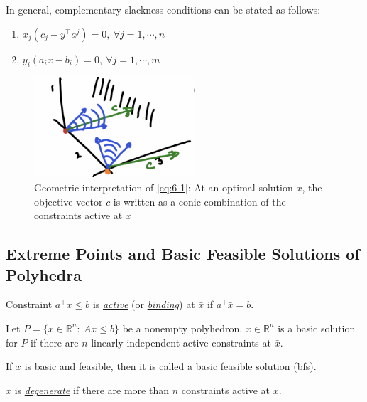 \documentclass[11pt]{article}
\numberwithin{equation}{section}
\begin{document}
In general, complementary slackness conditions can be stated as follows:
\begin{enumerate}[1.]
    \item $x_j(c_j - y^\top a^j)=0, \ \forall j=1, \cdots, n$
    \item $y_i(a_i x - b_i)=0, \ \forall j=1, \cdots, m$
\end{enumerate}

\begin{figure}[H]
    \centering
    \includegraphics[width=6cm]{images/6-ex-2.png}
    \caption{Geometric interpretation of \ref{eq:6-1}: At an optimal solution $x$, the objective vector $c$ is written as a conic combination of the constraints active at $x$}
\end{figure}

\subsection{Extreme Points and Basic Feasible Solutions of Polyhedra}
\begin{definition}
    Constraint $a^\top x \leq b$ is \underline{\textit{active}} (or \underline{\textit{binding}}) at $\bar{x}$ if $a^\top \bar{x}=b$.
\end{definition}

\begin{definition}
    Let $P=\{x \in \mathbb{R}^n: \ Ax \leq b\}$ be a nonempty polyhedron. $x \in \mathbb{R}^n$ is a basic solution for $P$ if there are $n$ linearly independent active constraints at $\bar{x}$.
\end{definition}

\begin{definition}
    If $\bar{x}$ is basic and feasible, then it is called a basic feasible solution (bfs).
\end{definition}

\begin{definition}
    $\bar{x}$ is \underline{\textit{degenerate}} if there are more than $n$ constraints active at $\bar{x}$.
\end{definition}
\end{document}
